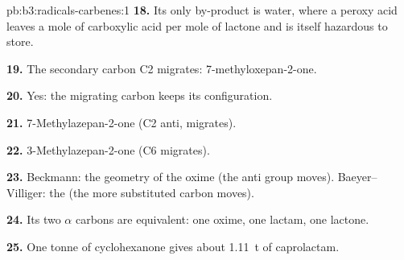 \begin{solution}{pb:b3:radicals-carbenes:1}
\textbf{18.} Its only by-product is water, where a peroxy acid leaves a mole of
carboxylic acid per mole of lactone and is itself hazardous to store.

\textbf{19.} The secondary carbon C2 migrates: 7-methyloxepan-2-one.

\textbf{20.} Yes: the migrating carbon keeps its configuration.

\textbf{21.} 7-Methylazepan-2-one (C2 anti, migrates).

\textbf{22.} 3-Methylazepan-2-one (C6 migrates).

\textbf{23.} Beckmann: the geometry of the oxime (the anti group moves).
Baeyer--Villiger: the  (the more substituted carbon moves).

\textbf{24.} Its two $\alpha$ carbons are equivalent: one oxime, one lactam, one lactone.

\textbf{25.} One tonne of cyclohexanone gives about \qty{1.11}{t} of caprolactam.
\end{solution}
